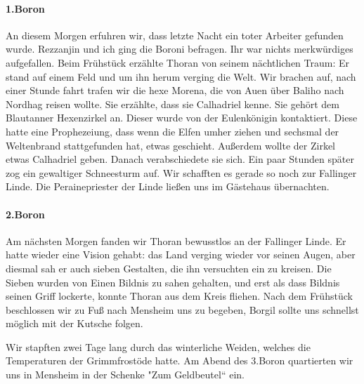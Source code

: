 \documentclass[11pt]{scrreprt}
\begin{document}
\paragraph{1.Boron}
An diesem Morgen erfuhren wir, dass letzte Nacht ein toter Arbeiter gefunden wurde. Rezzanjin und ich ging die Boroni befragen. Ihr war nichts merkwürdiges aufgefallen. Beim Frühstück erzählte Thoran von seinem nächtlichen Traum: Er stand auf einem Feld und um ihn herum verging die Welt. Wir brachen auf, nach einer Stunde fahrt trafen wir die hexe Morena, die von Auen über Baliho nach Nordhag reisen wollte. Sie erzählte, dass sie Calhadriel kenne. Sie gehört dem Blautanner Hexenzirkel an. Dieser wurde von der Eulenkönigin kontaktiert. Diese hatte eine Prophezeiung, dass wenn die Elfen umher ziehen und sechsmal der Weltenbrand stattgefunden hat, etwas geschieht. Außerdem wollte der Zirkel etwas Calhadriel geben. Danach verabschiedete sie sich. Ein paar Stunden später zog ein gewaltiger Schneesturm auf. Wir schafften es gerade so noch zur Fallinger Linde. Die Perainepriester der Linde ließen uns im Gästehaus übernachten.

\paragraph{2.Boron}
Am nächsten Morgen fanden wir Thoran bewusstlos an der Fallinger Linde. Er hatte wieder eine Vision gehabt: das Land verging wieder vor seinen Augen, aber diesmal sah er auch sieben Gestalten, die ihn versuchten ein zu kreisen. Die Sieben wurden von Einen Bildnis zu sahen gehalten, und erst als dass Bildnis seinen Griff lockerte, konnte Thoran aus dem Kreis fliehen. Nach dem Frühstück beschlossen wir zu Fuß nach Mensheim uns zu begeben, Borgil sollte uns schnellst möglich mit der Kutsche folgen.\par
Wir stapften zwei Tage lang durch das winterliche Weiden, welches die Temperaturen der Grimmfrostöde hatte. Am Abend des 3.Boron quartierten wir uns in Mensheim in der Schenke "Zum Geldbeutel“ ein.
\end{document}

